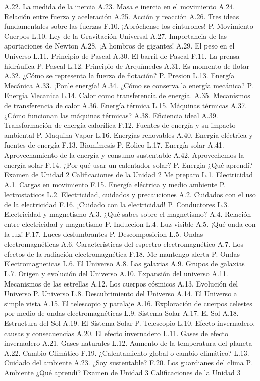 A.22. La medida de la inercia
A.23. Masa e inercia en el movimiento
A.24. Relación entre fuerza y aceleración
A.25. Acción y reacción
A.26. Tres ideas fundamentales sobre las fuerzas
F.10. ¡Abróchense los cinturones!
P.    Movimiento Cuerpos
L.10. Ley de la Gravitación Universal
A.27. Importancia de las aportaciones de Newton
A.28. ¡A hombros de gigantes!
A.29. El peso en el Universo
L.11. Principio de Pascal
A.30. El barril de Pascal
F.11. La prensa hidráulica
P.    Pascal
L.12. Principio de Arquímedes
A.31. Es momento de flotar
A.32. ¿Cómo se representa la fuerza de flotación?
P.    Presion
L.13. Energía Mecánica
A.33. ¡Ponle energía!
A.34. ¿Cómo se conserva la energía mecánica?
P.    Energia Mecanica
L.14. Calor como transferencia de energía.
A.35. Mecanismos de transferencia de calor
A.36. Energía térmica
L.15. Máquinas térmicas
A.37. ¿Cómo funcionan las máquinas térmicas?
A.38. Eficiencia ideal
A.39. Transformación de energía calorífica
F.12. Fuentes de energía y su impacto ambiental
P.    Maquina Vapor
L.16. Energías renovables
A.40. Energía eléctrica y fuentes de energía
F.13. Biomímesis
P.    Eolico
L.17. Energía solar
A.41. Aprovechamiento de la energía y consumo sustentable
A.42. Aprovechemos la energía solar
F.14. ¿Por qué usar un calentador solar?
P.    Energia
¿Qué aprendí?
Examen de Unidad 2
Calificaciones de la Unidad 2
Me preparo
L.1.  Electricidad
A.1.  Cargas en movimiento
F.15. Energía eléctrica y medio ambiente
P.    lectrostaticos
L.2.  Electricidad, cuidados y precauciones 
A.2.  Cuidados con el uso de la electricidad
F.16. ¡Cuidado con la electricidad!
P.    Conductores
L.3.  Electricidad y magnetismo 
A.3.  ¿Qué sabes sobre el magnetismo?
A.4.  Relación entre electricidad y magnetismo
P.    Induccion
L.4.  Luz visible 
A.5.  ¡Qué onda con la luz!
F.17.  Luces deslumbrantes
P.    Descomposicion
L.5.  Ondas electromagnéticas
A.6.  Características del espectro electromagnético
A.7.  Los efectos de la radiación electromagnética
F.18. Me mantengo alerta
P.    Ondas Electromagneticas
L.6.  El Universo 
A.8.  Las galaxias
A.9.  Grupos de galaxias
L.7.  Origen y evolución del Universo 
A.10. Expansión del universo
A.11. Mecanismos de las estrellas
A.12. Los cuerpos cósmicos
A.13. Evolución del Universo
P.    Universo
L.8.  Descubrimiento del Universo
A.14. El Universo a simple vista
A.15. El telescopio y paralaje
A.16. Exploración de cuerpos celestes por medio de ondas electromagnéticas
L.9.  Sistema Solar 
A.17. El Sol
A.18. Estructura del Sol
A.19. El Sistema Solar
P.    Telescopio
L.10. Efecto invernadero, causas y consecuencias 
A.20. El efecto invernadero
L.11. Gases de efecto invernadero 
A.21. Gases naturales
L.12. Aumento de la temperatura del planeta 
A.22. Cambio Climático
F.19. ¿Calentamiento global o cambio climático?
L.13. Cuidado del ambiente 
A.23. ¿Soy sustentable?
F.20. Los guardianes del clima
P. Ambiente
¿Qué aprendí?
Examen de Unidad 3
Calificaciones de la Unidad 3